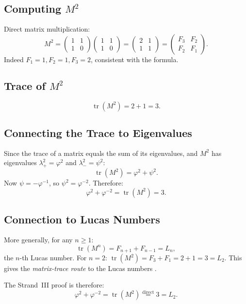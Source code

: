 \subsection{Computing $M^{2}$}

Direct matrix multiplication:
\[
  M^{2}
  = \begin{pmatrix}1&1\\1&0\end{pmatrix}
    \begin{pmatrix}1&1\\1&0\end{pmatrix}
  = \begin{pmatrix}2&1\\1&1\end{pmatrix}
  = \begin{pmatrix}F_{3}&F_{2}\\F_{2}&F_{1}\end{pmatrix}.
\]
Indeed $F_{1}=1, F_{2}=1, F_{3}=2$, consistent with the formula.

\subsection{Trace of $M^{2}$}

\[
  \operatorname{tr}(M^{2}) = 2 + 1 = 3.
\]

\subsection{Connecting the Trace to Eigenvalues}

Since the trace of a matrix equals the sum of its eigenvalues,
and $M^{2}$ has eigenvalues $\lambda_{+}^{2} = \varphi^{2}$ and
$\lambda_{-}^{2} = \psi^{2}$:
\[
  \operatorname{tr}(M^{2}) = \varphi^{2} + \psi^{2}.
\]
Now $\psi = -\varphi^{-1}$, so $\psi^{2} = \varphi^{-2}$.
Therefore:
\[
  \varphi^{2} + \varphi^{-2} = \operatorname{tr}(M^{2}) = 3.
\]

\subsection{Connection to Lucas Numbers}

More generally, for any $n \geq 1$:
\[
  \operatorname{tr}(M^{n}) = F_{n+1} + F_{n-1} = L_{n},
\]
the $n$-th Lucas number.
For $n=2$: $\operatorname{tr}(M^{2}) = F_{3}+F_{1} = 2+1 = 3 = L_{2}$.
This gives the \emph{matrix-trace route} to the Lucas numbers
\cite{vajda_fib_lucas}.

The Strand~III proof is therefore:
\[
  \varphi^{2}+\varphi^{-2}
  = \operatorname{tr}(M^{2})
  \stackrel{\text{direct}}{=} 3
  = L_{2}.
\]

